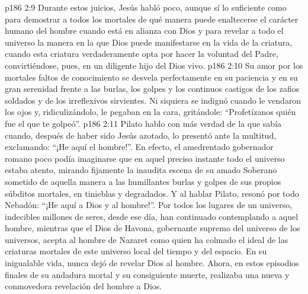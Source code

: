 \vs p186 2:9 Durante estos juicios, Jesús habló poco, aunque sí lo suficiente como para demostrar a todos los mortales de qué manera puede enaltecerse el carácter humano del hombre cuando está en alianza con Dios y para revelar a todo el universo la manera en la que Dios puede manifestarse en la vida de la criatura, cuando esta criatura verdaderamente opta por hacer la voluntad del Padre, convirtiéndose, pues, en un diligente hijo del Dios vivo.
\vs p186 2:10 Su amor por los mortales faltos de conocimiento se desvela perfectamente en su paciencia y en su gran serenidad frente a las burlas, los golpes y los continuos castigos de los zafios soldados y de los irreflexivos sirvientes. Ni siquiera se indignó cuando le vendaron los ojos y, ridiculizándolo, le pegaban en la cara, gritándole: “Profetízanos quién fue el que te golpeó”.
\vs p186 2:11 Pilato hablo con más verdad de la que sabía cuando, después de haber sido Jesús azotado, lo presentó ante la multitud, exclamando: “¡He aquí el hombre!”. En efecto, el amedrentado gobernador romano poco podía imaginarse que en aquel preciso instante todo el universo estaba atento, mirando fijamente la inaudita escena de su amado Soberano sometido de aquella manera a las humillantes burlas y golpes de sus propios súbditos mortales, en tinieblas y degradados. Y al hablar Pilato, resonó por todo Nebadón: “¡He aquí a Dios y al hombre!”. Por todos los lugares de un universo, indecibles millones de seres, desde ese día, han continuado contemplando a aquel hombre, mientras que el Dios de Havona, gobernante supremo del universo de los universos, acepta al hombre de Nazaret como quien ha colmado el ideal de las criaturas mortales de este universo local del tiempo y del espacio. En su inigualable vida, nunca dejó de revelar Dios al hombre. Ahora, en estos episodios finales de su andadura mortal y su consiguiente muerte, realizaba una nueva y conmovedora revelación del hombre a Dios.
